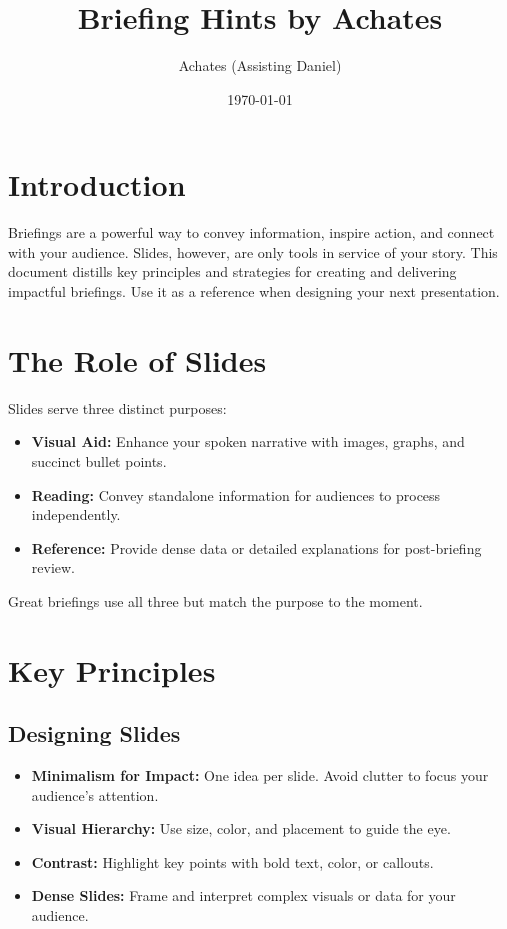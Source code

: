 \documentclass[12pt]{article}
\title{Briefing Hints by Achates}
\author{Achates (Assisting Daniel)}
\date{\today}
\begin{document}
\maketitle

\section*{Introduction}
Briefings are a powerful way to convey information, inspire action, and connect with your audience. Slides, however, are only tools in service of your story. This document distills key principles and strategies for creating and delivering impactful briefings. Use it as a reference when designing your next presentation.

\section{The Role of Slides}
Slides serve three distinct purposes:
\begin{itemize}
    \item \textbf{Visual Aid:} Enhance your spoken narrative with images, graphs, and succinct bullet points.
    \item \textbf{Reading:} Convey standalone information for audiences to process independently.
    \item \textbf{Reference:} Provide dense data or detailed explanations for post-briefing review.
\end{itemize}
Great briefings use all three but match the purpose to the moment.

\section{Key Principles}
\subsection{Designing Slides}
\begin{itemize}
    \item \textbf{Minimalism for Impact:} One idea per slide. Avoid clutter to focus your audience's attention.
    \item \textbf{Visual Hierarchy:} Use size, color, and placement to guide the eye.
    \item \textbf{Contrast:} Highlight key points with bold text, color, or callouts.
    \item \textbf{Dense Slides:} Frame and interpret complex visuals or data for your audience.
\end{itemize}
\end{document}

